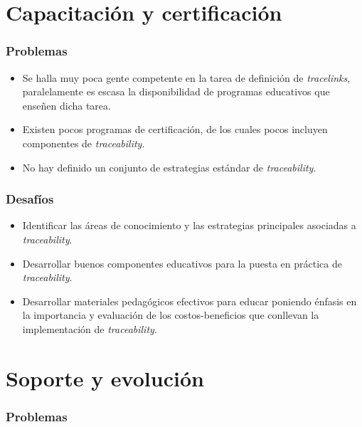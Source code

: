 \documentclass[a4paper,12pt,oneside,spanish]{book}
\begin{document}
\section{Capacitación y certificación}

\subsubsection{Problemas}

\begin{itemize}[label={$\times$}]
\item Se halla muy poca gente competente en la tarea de definición de \textit{tracelinks}, paralelamente es escasa la disponibilidad de programas educativos que enseñen dicha tarea.

\item Existen pocos programas de certificación, de los cuales pocos incluyen componentes de \textit{traceability}.

\item No hay definido un conjunto de estrategias estándar de \textit{traceability}.

\end{itemize}

\subsubsection{Desafíos}

\begin{itemize}[label={\checkmark}]
\item Identificar las áreas de conocimiento y las estrategias principales asociadas a \textit{traceability}.

\item Desarrollar buenos componentes educativos para la puesta en práctica de \textit{traceability}.

\item Desarrollar materiales pedagógicos efectivos para educar poniendo énfasis  en la importancia y evaluación de los costos-beneficios que conllevan la implementación de \textit{traceability}.

\end{itemize}

\section{Soporte y evolución}

\subsubsection{Problemas}
\end{document}

